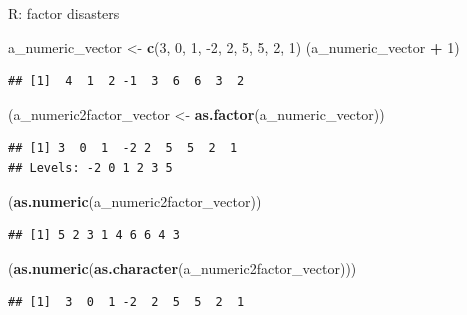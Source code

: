 \documentclass[ignorenonframetext,]{beamer}
\newenvironment{Shaded}{\begin{snugshade}}{\end{snugshade}}
\newcommand{\DecValTok}[1]{\textcolor[rgb]{0.00,0.00,0.81}{#1}}
\newcommand{\KeywordTok}[1]{\textcolor[rgb]{0.13,0.29,0.53}{\textbf{#1}}}
\newcommand{\NormalTok}[1]{#1}
\newcommand{\OperatorTok}[1]{\textcolor[rgb]{0.81,0.36,0.00}{\textbf{#1}}}
\newcommand{\StringTok}[1]{\textcolor[rgb]{0.31,0.60,0.02}{#1}}
\begin{document}
\begin{frame}[fragile]{R: factor disasters}
\protect\hypertarget{r-factor-disasters}{}

\begin{Shaded}
\begin{Highlighting}[]
\NormalTok{a_numeric_vector <-}\StringTok{ }\KeywordTok{c}\NormalTok{(}\DecValTok{3}\NormalTok{, }\DecValTok{0}\NormalTok{, }\DecValTok{1}\NormalTok{, }\DecValTok{-2}\NormalTok{, }\DecValTok{2}\NormalTok{, }\DecValTok{5}\NormalTok{, }\DecValTok{5}\NormalTok{, }\DecValTok{2}\NormalTok{, }\DecValTok{1}\NormalTok{)}
\NormalTok{(a_numeric_vector }\OperatorTok{+}\StringTok{ }\DecValTok{1}\NormalTok{)}
\end{Highlighting}
\end{Shaded}

\begin{verbatim}
## [1]  4  1  2 -1  3  6  6  3  2
\end{verbatim}

\begin{Shaded}
\begin{Highlighting}[]
\NormalTok{(a_numeric2factor_vector <-}\StringTok{ }\KeywordTok{as.factor}\NormalTok{(a_numeric_vector))}
\end{Highlighting}
\end{Shaded}

\begin{verbatim}
## [1] 3  0  1  -2 2  5  5  2  1 
## Levels: -2 0 1 2 3 5
\end{verbatim}

\begin{Shaded}
\begin{Highlighting}[]
\NormalTok{(}\KeywordTok{as.numeric}\NormalTok{(a_numeric2factor_vector))}
\end{Highlighting}
\end{Shaded}

\begin{verbatim}
## [1] 5 2 3 1 4 6 6 4 3
\end{verbatim}

\begin{Shaded}
\begin{Highlighting}[]
\NormalTok{(}\KeywordTok{as.numeric}\NormalTok{(}\KeywordTok{as.character}\NormalTok{(a_numeric2factor_vector)))}
\end{Highlighting}
\end{Shaded}

\begin{verbatim}
## [1]  3  0  1 -2  2  5  5  2  1
\end{verbatim}

\end{frame}
\end{document}
